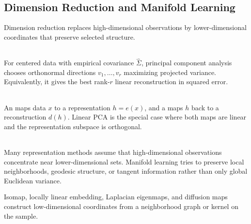 \subsection{Dimension Reduction and Manifold Learning}

Dimension reduction replaces high-dimensional observations by lower-dimensional coordinates that preserve selected structure.

\begin{definition} \label{def:sl-principal-component-analysis} \\
For centered data with empirical covariance $\widehat{\Sigma}$, principal component analysis chooses orthonormal directions $v_1,\ldots,v_r$ maximizing projected variance.  Equivalently, it gives the best rank-$r$ linear reconstruction in squared error.
\end{definition}

\begin{definition} \label{def:sl-encoder-decoder} \\
An  maps data $x$ to a representation $h=e(x)$, and a  maps $h$ back to a reconstruction $d(h)$.  Linear PCA is the special case where both maps are linear and the representation subspace is orthogonal.
\end{definition}

\begin{remark} \label{rem:sl-manifold-hypothesis} \\
Many representation methods assume that high-dimensional observations concentrate near lower-dimensional sets.  Manifold learning tries to preserve local neighborhoods, geodesic structure, or tangent information rather than only global Euclidean variance.
\end{remark}

\begin{example} \label{ex:sl-manifold-methods} 
Isomap, locally linear embedding, Laplacian eigenmaps, and diffusion maps construct low-dimensional coordinates from a neighborhood graph or kernel on the sample.
\end{example}
